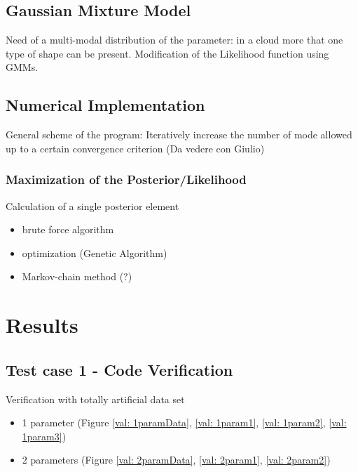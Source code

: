\documentclass[a4paper,12pt,twoside,titlepage,openright]{book}
\newcommand{\fref}[1]{Figure \ref{#1}}
\begin{document}
	\section{Gaussian Mixture Model}
		Need of a multi-modal distribution of the parameter: in a cloud more that one type of shape can be present. Modification of the Likelihood function using GMMs.
		
	\section{Numerical Implementation}
		General scheme of the program: Iteratively increase the number of mode allowed up to a certain convergence criterion (Da vedere con Giulio)
	
	\subsection{Maximization of the Posterior/Likelihood}
		Calculation of a single posterior element
		\begin{itemize}
			\item brute force algorithm
			\item optimization (Genetic Algorithm)
			\item Markov-chain method (?)
		\end{itemize}
	
	
\chapter{Results}
	\section{Test case 1 - Code Verification}
		Verification with totally artificial data set
		\begin{itemize}
			\item 1 parameter (\fref{val: 1paramData}, \ref{val: 1param1}, \ref{val: 1param2}, \ref{val: 1param3})
			\item 2 parameters (\fref{val: 2paramData}, \ref{val: 2param1}, \ref{val: 2param2})
		\end{itemize}
	
\end{document}
